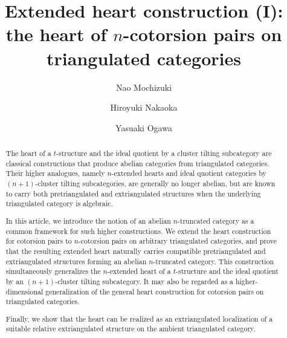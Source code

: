 \documentclass[a4paper,reqno,10pt]{amsart}
\DeclareRobustCommand{\darkblueedit}[1]{#1}
\theoremstyle{definition}
\theoremstyle{definition}
\theoremstyle{definition}
\theoremstyle{definition}
\theoremstyle{plain}
\begin{document}
\setlength{\baselineskip}{15pt}
\title
[Extended heart construction (I)]{Extended heart construction (I): the heart of $n$-cotorsion pairs on triangulated categories}

\author[Mochizuki]{Nao Mochizuki}
	\address{\darkblueedit{Graduate School of Mathematics, Nagoya University, Furo-cho, Chikusa-ku, Nagoya 464-8602, Japan}}

\author[Nakaoka]{Hiroyuki Nakaoka}
	\address{\darkblueedit{Department of Mathematical Sciences, University of the Ryukyus, 1 Senbaru, Nishihara, Okinawa 903-0213, Japan}}

\author[Ogawa]{Yasuaki Ogawa}
	\address{Faculty of Engineering Science, Kansai University, Suita-shi, Osaka 564-8680, Japan}

\keywords{%
Triangulated category, extended heart, $n$-cotorsion pair, pretriangulated/extriangulated category}
\subjclass[2020]{%
Primary 18G80; Secondary 18E10, 18E35}

\begin{abstract}
\color{blue}
The heart of a $t$-structure and the ideal quotient by a cluster tilting subcategory are classical constructions that produce abelian categories from triangulated categories.
Their higher analogues, namely $n$-extended hearts and ideal quotient categories by $(n+1)$-cluster tilting subcategories, are generally no longer abelian, but are known to carry both pretriangulated and extriangulated structures when the underlying triangulated category is algebraic.

In this article, we introduce the notion of an abelian $n$-truncated category as a common framework for such higher constructions.
We extend the heart construction for cotorsion pairs to $n$-cotorsion pairs on arbitrary triangulated categories, and prove that the resulting extended heart naturally carries compatible pretriangulated and extriangulated structures forming an abelian $n$-truncated category.
This construction simultaneously generalizes the $n$-extended heart of a $t$-structure and the ideal quotient by an $(n+1)$-cluster tilting subcategory.
It may also be regarded as a higher-dimensional generalization of the general heart construction for cotorsion pairs on triangulated categories.

Finally, we show that the heart can be realized as an extriangulated localization of a suitable relative extriangulated structure on the ambient triangulated category.
\normalcolor
\end{abstract}
\maketitle
\tableofcontents
\end{document}
